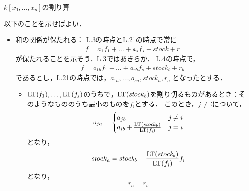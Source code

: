 \begin{myproof}
 \begin{algorithm}[H]
\caption{$k[x_1,\dots,x_n]$の割り算}
  \begin{algorithmic}[1]
   \ENDIF{}
   \ENDWHILE{}
   \ENDIF{}
   \ENDWHILE{}
  \end{algorithmic}
 \end{algorithm}
以下のことを示せばよい．
 \begin{itemize}
  \item 和の関係が保たれる：
L.3の時点とL.21の時点で常に
\begin{align}
 f = a_1 f_1 + \dots + a_s f_s + stock + r
\end{align}
が保たれることを示そう．L.3ではあきらか．
L.4の時点で，
\begin{align}
 f = a_{1b} f_1 + \dots + a_{sb} f_s + stock_b + r_b
\end{align}
であるとし，L.21の時点では，$a_{1a},\dots,a_{sa},stock_{a},r_a$
となったとする．
\begin{itemize}
 \item ${\rm LT}(f_1),\dots,{\rm LT}(f_s)$のうちで，${\rm LT}(stock_b)$を割り切るものがあるとき：そのようなもののうち最小のものを$f_i$とする．
このとき，$j\neq i$について，
\begin{align}
 a_{ja} =
\begin{cases}
 a_{jb} & j\neq i\\
 a_{ib} + \frac{{\rm LT}(stock_b)}{{\rm LT}(f_i)} &  j= i
\end{cases}
\end{align}
となり，
\begin{align}
 stock_a = stock_b - \frac{{\rm LT}(stock_b)}{{\rm LT}(f_i)}f_i
\end{align}
となり，
\begin{align}
 r_a = r_b
\end{align}

\end{itemize}
\end{itemize}
\end{myproof}
